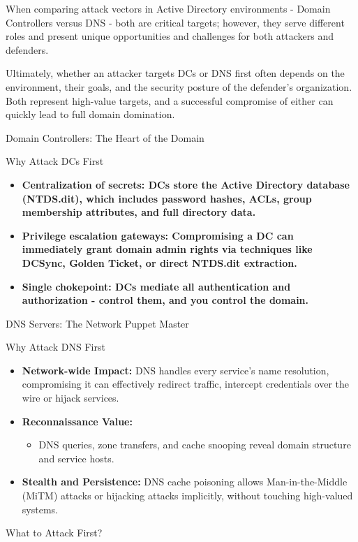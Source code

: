 When comparing attack vectors in Active Directory environments - Domain Controllers versus DNS - both are critical targets; however, they serve different roles and present unique opportunities and challenges for both attackers and defenders.

Ultimately, whether an attacker targets DCs or DNS first often depends on the environment, their goals, and the security posture of the defender’s organization. Both represent high-value targets, and a successful compromise of either can quickly lead to full domain domination.

Domain Controllers: The Heart of the Domain

Why Attack DCs First

\begin{itemize}
    \item \textbf{\textbf{Centralization of secrets: }DCs store the Active Directory database (NTDS.dit), which includes password hashes, ACLs, group membership attributes, and full directory data.}
    \item \textbf{\textbf{Privilege escalation gateways: }Compromising a DC can immediately grant domain admin rights via techniques like DCSync, Golden Ticket, or direct NTDS.dit extraction.}
    \item \textbf{\textbf{Single chokepoint: }DCs mediate all authentication and authorization - control them, and you control the domain.}
\end{itemize}

DNS Servers: The Network Puppet Master

Why Attack DNS First
\begin{itemize}
    \item \textbf{Network-wide Impact:} DNS handles every service's name resolution, compromising it can effectively redirect traffic, intercept credentials over the wire or hijack services.
    \item \textbf{Reconnaissance Value:}
    \begin{itemize}
        \item DNS queries, zone transfers, and cache snooping reveal domain structure and service hosts.
    \end{itemize}
    \item \textbf{Stealth and Persistence:} DNS cache poisoning allows Man-in-the-Middle (MiTM) attacks or hijacking attacks implicitly, without touching high-valued systems.
\end{itemize}

What to Attack First?


